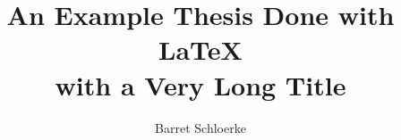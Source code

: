 \documentclass[ece,dissertation]{puthesis}
\title{An Example Thesis Done with LaTeX\\
  with a Very Long Title}
\author{Barret Schloerke}{Schloerke, Barret}
\begin{document}
\volume












\appendices










\end{document}
